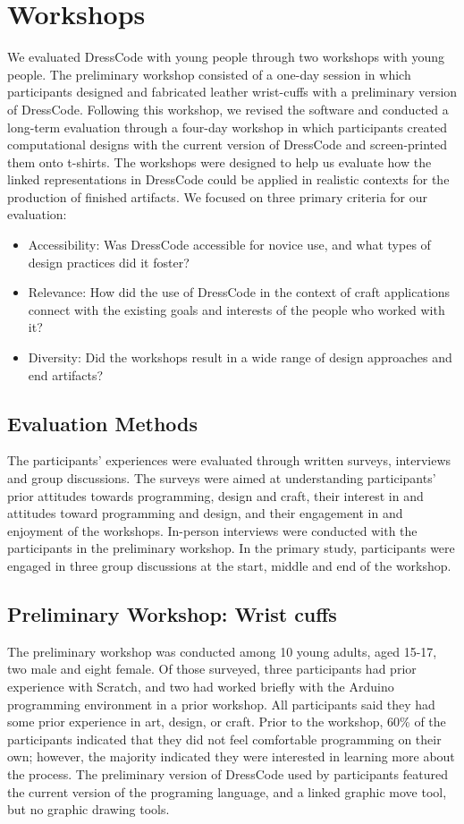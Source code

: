 \documentclass{sigchi}
\begin{document}
\section{Workshops}
We evaluated DressCode with young people through two workshops with young people. The preliminary workshop consisted of a one-day session in which participants designed and fabricated leather wrist-cuffs with a preliminary version of DressCode. Following this workshop, we revised the software and conducted a long-term evaluation through a four-day workshop in which participants created computational designs with the current version of DressCode and screen-printed them onto t-shirts. The workshops were designed to help us evaluate how the linked representations in DressCode could be applied in realistic contexts for the production of finished artifacts. We focused on three primary criteria for our evaluation:
\begin{itemize}
\item Accessibility: Was DressCode accessible for novice use, and what types of design practices did it foster?
\item Relevance: How did the use of DressCode in the context of craft applications connect with the existing goals and interests of the people who worked with it?
\item Diversity: Did the workshops result in a wide range of design approaches and end artifacts?
\end{itemize}

\subsection{Evaluation Methods}
The participants' experiences were evaluated through written surveys, interviews and group discussions. The surveys were aimed at understanding participants’ prior attitudes towards programming, design and craft, their interest in and attitudes toward programming and design, and their engagement in and enjoyment of the workshops. In-person interviews were conducted with the participants in the preliminary workshop. In the primary study, participants were engaged in three group discussions at the start, middle and end of the workshop.

\subsection{Preliminary Workshop: Wrist cuffs}
The preliminary workshop was conducted among 10 young adults, aged 15-17, two male and eight female. Of those surveyed, three participants had prior experience with Scratch, and two had worked briefly with the Arduino programming environment in a prior workshop. All participants said they had some prior experience in art, design, or craft. Prior to the workshop, 60\% of the participants indicated that they did not feel comfortable programming on their own; however, the majority indicated they were interested in learning more about the process. The preliminary version of DressCode used by participants featured the current version of the programing language, and a linked graphic move tool, but no graphic drawing tools.
\end{document}
